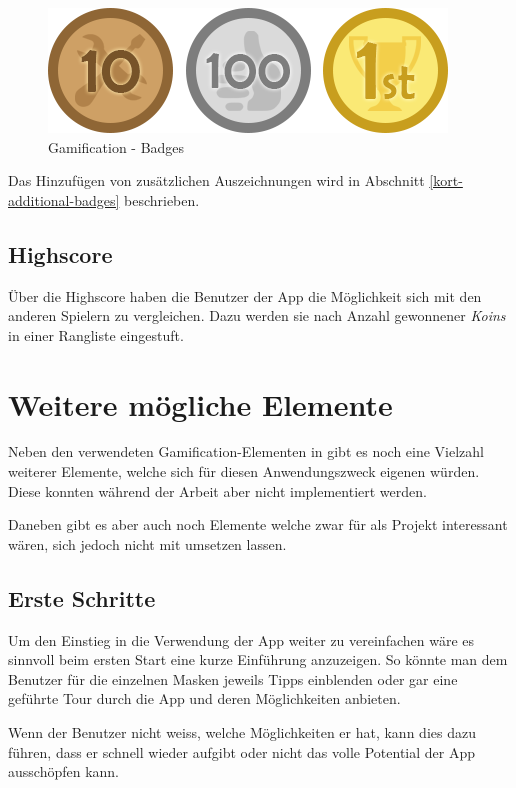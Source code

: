 \begin{figure}[H]
	\centering
	\includegraphics[scale=0.7]{images/gamification/gamification-badges}
	\caption{Gamification - Badges}
	\label{gamification-badges}
\end{figure}

Das Hinzufügen von zusätzlichen Auszeichnungen wird in Abschnitt \ref{kort-additional-badges} beschrieben.

\subsection{Highscore}
Über die Highscore haben die Benutzer der App die Möglichkeit sich mit den anderen Spielern zu vergleichen.
Dazu werden sie nach Anzahl gewonnener \emph{Koins} in einer Rangliste eingestuft.

\section{Weitere mögliche Elemente}
Neben den verwendeten \gls{Gamification}-Elementen in \kort{} gibt es noch eine Vielzahl weiterer Elemente, welche sich für diesen Anwendungszweck eigenen würden.
Diese konnten während der Arbeit aber nicht implementiert werden.

Daneben gibt es aber auch noch Elemente welche zwar für  als Projekt interessant wären, sich jedoch nicht mit \kort{} umsetzen lassen.

\subsection{Erste Schritte}
Um den Einstieg in die Verwendung der App weiter zu vereinfachen wäre es sinnvoll beim ersten Start eine kurze Einführung anzuzeigen.
So könnte man dem Benutzer für die einzelnen Masken jeweils Tipps einblenden oder gar eine geführte Tour durch die App und deren Möglichkeiten anbieten.

Wenn der Benutzer nicht weiss, welche Möglichkeiten er hat, kann dies dazu führen, dass er schnell wieder aufgibt oder nicht das volle Potential der App ausschöpfen kann.

